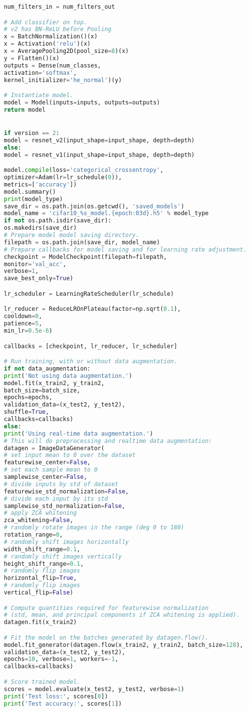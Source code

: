 \begin{lstlisting}[language=Python,label={code:resnet},caption={ResNet Code}]
num_filters_in = num_filters_out

# Add classifier on top.
# v2 has BN-ReLU before Pooling
x = BatchNormalization()(x)
x = Activation('relu')(x)
x = AveragePooling2D(pool_size=8)(x)
y = Flatten()(x)
outputs = Dense(num_classes,
activation='softmax',
kernel_initializer='he_normal')(y)

# Instantiate model.
model = Model(inputs=inputs, outputs=outputs)
return model


if version == 2:
model = resnet_v2(input_shape=input_shape, depth=depth)
else:
model = resnet_v1(input_shape=input_shape, depth=depth)

model.compile(loss='categorical_crossentropy',
optimizer=Adam(lr=lr_schedule(0)),
metrics=['accuracy'])
model.summary()
print(model_type)
save_dir = os.path.join(os.getcwd(), 'saved_models')
model_name = 'cifar10_%s_model.{epoch:03d}.h5' % model_type
if not os.path.isdir(save_dir):
os.makedirs(save_dir)
# Prepare model model saving directory.
filepath = os.path.join(save_dir, model_name)
# Prepare callbacks for model saving and for learning rate adjustment.
checkpoint = ModelCheckpoint(filepath=filepath,
monitor='val_acc',
verbose=1,
save_best_only=True)

lr_scheduler = LearningRateScheduler(lr_schedule)

lr_reducer = ReduceLROnPlateau(factor=np.sqrt(0.1),
cooldown=0,
patience=5,
min_lr=0.5e-6)

callbacks = [checkpoint, lr_reducer, lr_scheduler]

# Run training, with or without data augmentation.
if not data_augmentation:
print('Not using data augmentation.')
model.fit(x_train2, y_train2,
batch_size=batch_size,
epochs=epochs,
validation_data=(x_test2, y_test2),
shuffle=True,
callbacks=callbacks)
else:
print('Using real-time data augmentation.')
# This will do preprocessing and realtime data augmentation:
datagen = ImageDataGenerator(
# set input mean to 0 over the dataset
featurewise_center=False,
# set each sample mean to 0
samplewise_center=False,
# divide inputs by std of dataset
featurewise_std_normalization=False,
# divide each input by its std
samplewise_std_normalization=False,
# apply ZCA whitening
zca_whitening=False,
# randomly rotate images in the range (deg 0 to 180)
rotation_range=0,
# randomly shift images horizontally
width_shift_range=0.1,
# randomly shift images vertically
height_shift_range=0.1,
# randomly flip images
horizontal_flip=True,
# randomly flip images
vertical_flip=False)

# Compute quantities required for featurewise normalization
# (std, mean, and principal components if ZCA whitening is applied).
datagen.fit(x_train2)

# Fit the model on the batches generated by datagen.flow().
model.fit_generator(datagen.flow(x_train2, y_train2, batch_size=128),
validation_data=(x_test2, y_test2),
epochs=10, verbose=1, workers=-1,
callbacks=callbacks)

# Score trained model.
scores = model.evaluate(x_test2, y_test2, verbose=1)
print('Test loss:', scores[0])
print('Test accuracy:', scores[1])
\end{lstlisting}


